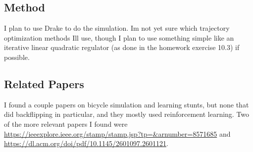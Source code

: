 \documentclass[
]{article}
\begin{document}
\hypertarget{method}{%
\subsection{Method}\label{method}}

I plan to use Drake to do the simulation. I\textquotesingle m not yet
sure which trajectory optimization methods I\textquotesingle ll use,
though I plan to use something simple like an iterative linear quadratic
regulator (as done in the homework exercise 10.3) if possible.

\hypertarget{related-papers}{%
\subsection{Related Papers}\label{related-papers}}

I found a couple papers on bicycle simulation and learning stunts, but
none that did backflipping in particular, and they mostly used
reinforcement learning. Two of the more relevant papers I found were
\url{https://ieeexplore.ieee.org/stamp/stamp.jsp?tp=\&arnumber=8571685}
and \url{https://dl.acm.org/doi/pdf/10.1145/2601097.2601121}.
\end{document}
